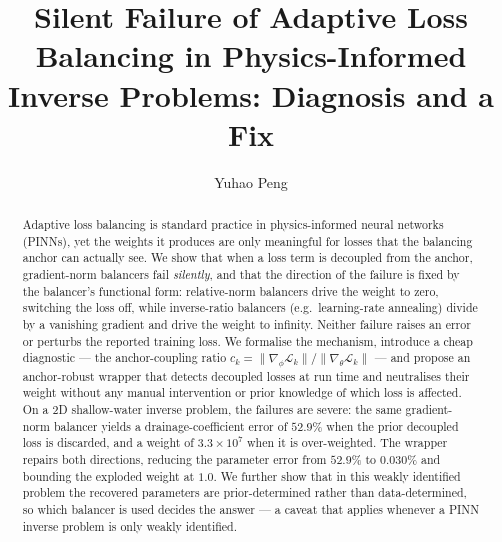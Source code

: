 \documentclass[a4paper,fleqn]{cas-sc}
\begin{document}
\let\WriteBookmarks\relax
\def\floatpagepagefraction{1}
\def\textpagefraction{.001}


\title[mode=title]{Silent Failure of Adaptive Loss Balancing in
Physics-Informed Inverse Problems: Diagnosis and a Fix}

\author[1]{Yuhao Peng}
\cormark[1]



\begin{abstract}
Adaptive loss balancing is standard practice in physics-informed neural
networks (PINNs), yet the weights it produces are only meaningful for losses
that the balancing anchor can actually see. We show that when a loss term is
decoupled from the anchor, gradient-norm balancers fail \emph{silently}, and
that the direction of the failure is fixed by the balancer's functional form:
relative-norm balancers drive the weight to zero, switching the loss off,
while inverse-ratio balancers (e.g.\ learning-rate annealing) divide by a
vanishing gradient and drive the weight to infinity. Neither failure raises an
error or perturbs the reported training loss. We formalise the mechanism,
introduce a cheap diagnostic --- the anchor-coupling ratio
$c_k = \lVert\nabla_\phi \mathcal{L}_k\rVert / \lVert\nabla_\theta
\mathcal{L}_k\rVert$ --- and propose an anchor-robust wrapper that detects
decoupled losses at run time and neutralises their weight without any manual
intervention or prior knowledge of which loss is affected. On a 2D
shallow-water inverse problem, the failures are severe: the same gradient-norm
balancer yields a drainage-coefficient error of $52.9\%$ when the prior
decoupled loss is discarded, and a weight of $3.3\times10^7$ when it is
over-weighted. The wrapper repairs both directions, reducing the parameter
error from $52.9\%$ to $0.030\%$ and bounding the exploded weight at $1.0$.
We further show that in this weakly identified problem the recovered
parameters are prior-determined rather than data-determined, so which balancer
is used decides the answer --- a caveat that applies whenever a PINN inverse
problem is only weakly identified.
\end{abstract}
\end{document}
